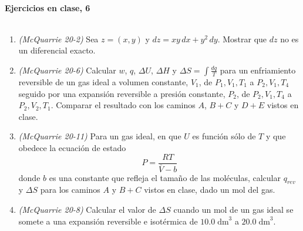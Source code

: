 \documentclass[a4paper,12pt]{article}
\begin{document}

\begin{center}
\HRule \\[0.4cm]
{ \bfseries Ejercicios en clase, 6}\\ %
\HRule \\[0.4cm]
\end{center}


\begin{enumerate}

 \item \textit{(McQuarrie 20-2)} Sea $z=(x,y)$ y $dz=xy\,dx+y^2\,dy$. Mostrar que $dz$ no es un diferencial exacto. %

 \item \textit{(McQuarrie 20-6)} Calcular $w$, $q$, $\Delta U$, $\Delta H$ y $\Delta S=\int\frac{dq}{T}$ para un enfriamiento reversible de un gas ideal a volumen constante, $V_1$, de $P_1, V_1, T_1$ a $P_2, V_1, T_4$ seguido por una expansi\'on reversible a presi\'on constante, $P_2$, de $P_2, V_1, T_4$ a $P_2, V_2, T_1$. Comparar el resultado con los caminos $A$, $B+C$ y $D+E$ vistos en clase. %

 \item \textit{(McQuarrie 20-11)} Para un gas ideal, en que $U$ es funci\'on s\'olo de $T$ y que obedece la ecuaci\'on de estado
$$P=\frac{RT}{\bar{V}-b}$$
donde $b$ es una constante que refleja el tama\~no de las mol\'eculas, calcular $q_{rev}$ y $\Delta S$ para los caminos $A$ y $B+C$ vistos en clase, dado un mol del gas. %

 \item \textit{(McQuarrie 20-8)} Calcular el valor de $\Delta S$ cuando un mol de un gas ideal se somete a una expansi\'on reversible e isot\'ermica de $10.0\;\mbox{dm}^3$ a $20.0\;\mbox{dm}^3$. %

\end{enumerate}
 
\end{document}
